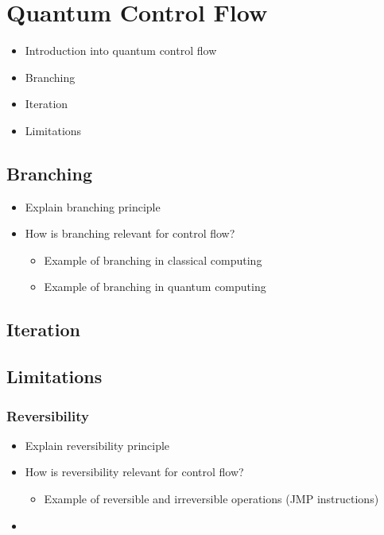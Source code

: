 \section{Quantum Control Flow}
\begin{itemize}
    \item Introduction into quantum control flow
    \item Branching
    \item Iteration
    \item Limitations
\end{itemize}

\subsection{Branching}
\begin{itemize}
    \item Explain branching principle
    \item How is branching relevant for control flow?
    \begin{itemize}
        \item Example of branching in classical computing
        \item Example of branching in quantum computing
    \end{itemize}
\end{itemize}

\subsection{Iteration}

\subsection{Limitations}	

\subsubsection{Reversibility}
\begin{itemize}
    \item Explain reversibility principle
    \item How is reversibility relevant for control flow?
    \begin{itemize}
        \item Example of reversible and irreversible operations (JMP instructions)
    \end{itemize} 
    \item 
\end{itemize}
